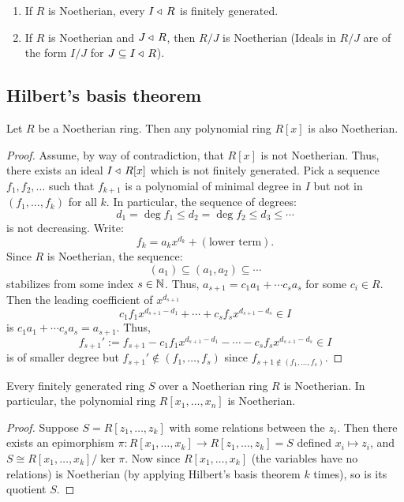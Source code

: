 \documentclass[11pt,a4paper]{article}
\begin{document}
\begin{remark} \phantom{}
  \begin{enumerate}
    \item[(1)] If $R$ is Noetherian,
      every $I \triangleleft\, R$ is finitely generated.
    \item[(2)] If $R$ is Noetherian and $J \triangleleft\, R$,
      then $R/J$ is Noetherian (Ideals in $R/J$ are of the form $I/J$
      for $J \subseteq I \triangleleft\, R$).
  \end{enumerate}
\end{remark}

\subsection{Hilbert's basis theorem}

\begin{theorem}
  Let $R$ be a Noetherian ring.
  Then any polynomial ring $R[x]$
  is also Noetherian.
\end{theorem}
\begin{proof}
  Assume, by way of contradiction, that $R[x]$ is not Noetherian.
  Thus, there exists an ideal $I \triangleleft\, R[x]$ which is not finitely
  generated.
  Pick a sequence $f_1,f_2,\dots$ such that $f_{k+1}$ is a polynomial
  of minimal degree in $I$ but not in $(f_1,\dots,f_k)$ for all $k$.
  In particular, the sequence of degrees:
  \[
    d_1 = \deg f_1 \le d_2 = \deg f_2 \le d_3 \le \cdots
  \]
  is not decreasing.
  Write:
  \[
    f_k = a_k x^{d_k} + (\text{lower term}).
  \]
  Since $R$ is Noetherian, the sequence:
  \[
    (a_1) \subseteq (a_1,a_2) \subseteq \cdots
  \]
  stabilizes from some index $s \in \mathbb{N}$.
  Thus, $a_{s+1} = c_1 a_1 + \cdots c_s a_s$
  for some $c_i \in R$.
  Then the leading coefficient of $x^{d_{s+1}}$
  \[
    c_1 f_1 x^{d_{s+1} - d_1} + \cdots + c_s f_s x^{d_{s+1}-d_s} \in I
  \]
  is $c_1 a_1 + \cdots c_s a_s = a_{s+1}$.
  Thus,
  \[
    f_{s+1}' :=
    f_{s+1} - 
    c_1 f_1 x^{d_{s+1} - d_1} - \cdots - c_s f_s x^{d_{s+1}-d_s} \in I
  \]
  is of smaller degree
  but $f_{s+1}' \notin (f_1,\dots,f_s)$
  since $f_{s+1 \notin (f_1,\dots,f_s)}$.
\end{proof}

\begin{corollary}
  Every finitely generated ring $S$ over a Noetherian
  ring $R$ is Noetherian.
  In particular, the polynomial ring
  $R[x_1,\dots,x_n]$ is Noetherian.
\end{corollary}
\begin{proof}
  Suppose $S = R[z_1,\dots,z_k]$ with some relations
  between the $z_i$.
  Then there exists an epimorphism
  $\pi \colon R[x_1,\dots,x_k] \to R[z_1,\dots,z_k] = S$
  defined $x_i \mapsto z_i$,
  and $S \cong R[x_1,\dots,x_k]/\ker \pi$.
  Now since $R[x_1,\dots,x_k]$ (the variables have no relations)
  is Noetherian (by applying Hilbert's basis theorem $k$ times),
  so is its quotient $S$.
\end{proof}
\end{document}
